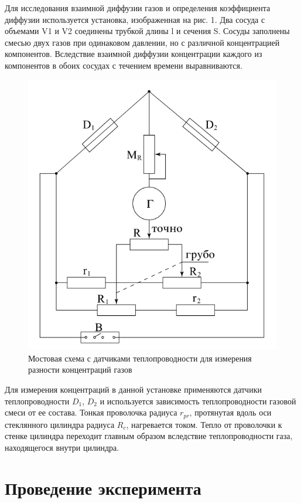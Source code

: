 \documentclass[14pt, a4paper]{report}
\begin{document}
Для исследования взаимной диффузии газов и определения коэффициента диффузии используется установка, изображенная на рис. 1. Два сосуда с объемами V1 и V2 соединены трубкой длины l и сечения S. Сосуды заполнены смесью двух газов при одинаковом давлении, но с различной концентрацией компонентов. Вследствие взаимной диффузии концентрации каждого из компонентов в обоих сосудах с течением времени выравниваются.

\begin{figure}[!ht]
\centering
\includegraphics[width=0.6\linewidth]{terma_4_2.png}
\caption{Мостовая схема с датчиками теплопроводности для измерения разности концентраций газов}
\end{figure}

Для измерения концентраций в данной установке применяются датчики теплопроводности $D_1$, $D_2$ и используется зависимость теплопроводности газовой смеси от ее состава. Тонкая проволочка радиуса $r_{pr}$, протянутая вдоль оси стеклянного цилиндра радиуса $R_{c}$, нагревается током. Тепло от проволочки к стенке цилиндра переходит главным образом вследствие теплопроводности газа, находящегося внутри цилиндра.

\section{Проведение эксперимента}
\end{document}
